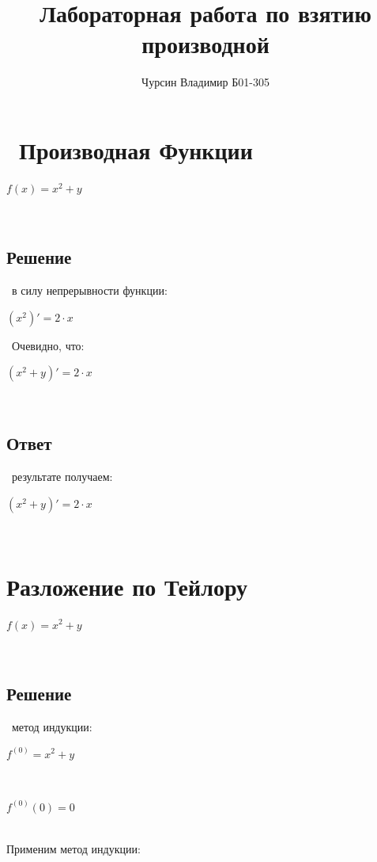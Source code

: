 \documentclass[a4paper,14pt]{extarticle}
\title{\textbf{Лабораторная работа по взятию производной }}\author{Чурсин Владимир Б01-305}
\begin{document}
\maketitle
\section{\ Производная Функции \\}\begin{center}$f\left(x\right) = x^2+y$ \end{center}\  
\subsection{Решение}\  в силу непрерывности функции: \\ 

\begin{center}$\left(x^2 \right)' = 2 \cdot x$\end{center}\ 
Очевидно, что: \\ 

\begin{center}$\left(x^2+y \right)' = 2 \cdot x$\end{center}\ 
\subsection{Ответ}\  результате получаем: \\
\begin{center}$\left(x^2+y \right)' = 2 \cdot x$\end{center}\ 
\section{Разложение по Тейлору}\begin{center}$f\left(x\right) = x^2+y$ \end{center}\ 
\subsection{Решение}\  метод индукции: \\ 

\begin{center}$f^{\left(0\right)} = x^2+y$\end{center}\ 
\begin{center}$f^{\left(0\right)}\left(0\right) = 0
$\end{center}\ \newline \\ 
Применим метод индукции: \\ 
\end{document}
